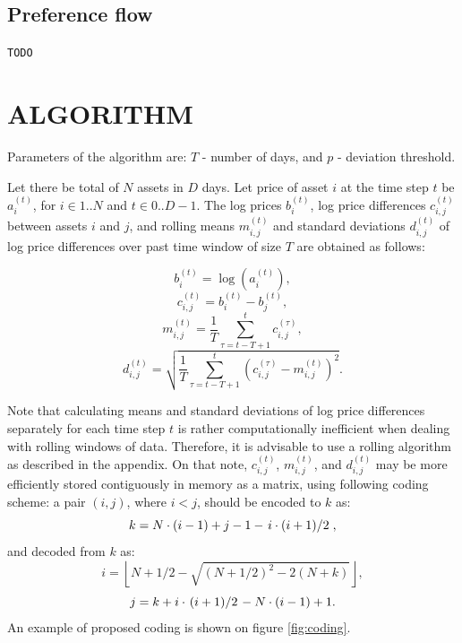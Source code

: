 \documentclass[letterpaper, 10 pt, conference]{ieeeconf}
\begin{document}
  \subsection{Preference flow}
  
  \verb|TODO|
    
  \section{ALGORITHM} 
  
  Parameters of the algorithm are: $T$ - number of days, and $p$ - deviation threshold.
  
  Let there be total of $N$ assets in $D$ days.
  Let price of asset $i$ at the time step $t$ be $a_i^{(t)}$, for $i \in 1..N$ and $t \in 0..D-1$.
  The log prices $b_i^{(t)}$, log price differences $c_{i,j}^{(t)}$ between assets $i$ and $j$, and rolling means $m_{i,j}^{(t)}$ and standard deviations $d_{i,j}^{(t)}$ of log price differences over past time window of size $T$ are obtained as follows:
  
  \begin{equation} b_i^{(t)} = \log\left(a_i^{(t)}\right), \end{equation}
  \begin{equation} c_{i,j}^{(t)} = b_i^{(t)} - b_j^{(t)}, \end{equation}
  \begin{equation} m_{i,j}^{(t)} = \frac{1}{T}\sum_{\tau=t-T+1}^{t} c_{i,j}^{(\tau)} \label{eq:m}, \end{equation}
  \begin{equation} d_{i,j}^{(t)} = \sqrt{\frac{1}{T}\sum_{\tau=t-T+1}^{t} \left(c_{i,j}^{(\tau)} - m_{i,j}^{(t)} \right)^2} \label{eq:d}. \end{equation}
  
  Note that calculating means and standard deviations of log price differences separately for each time step $t$ is rather computationally inefficient when dealing with rolling windows of data.
  Therefore, it is advisable to use a rolling algorithm as described in the appendix.
  On that note, $c_{i,j}^{(t)}$, $m_{i,j}^{(t)}$, and $d_{i,j}^{(t)}$ may be more efficiently stored contiguously in memory as a matrix, using following coding scheme: a pair $(i, j)$, where $i < j$, should be encoded to $k$ as:
  \begin{equation} k = N \cdot (i - 1) + j - 1 - \left. i \cdot (i + 1) \middle/ 2\right., \end{equation}
  and decoded from $k$ as:
  \begin{equation} i = \left\lfloor N + 1/2 - \sqrt{(N + 1/2)^2 - 2(N + k)} \right\rfloor, \end{equation}
  \begin{equation} j = k + i \cdot \left.(i + 1) \middle/ 2\right. - N \cdot (i - 1) + 1. \end{equation}
  An example of proposed coding is shown on figure \ref{fig:coding}.
  
\end{document}
